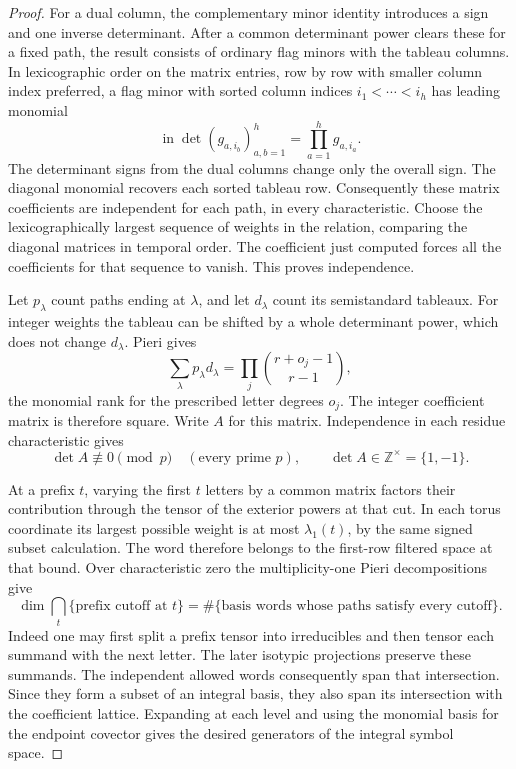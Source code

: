 \begin{proof}
For a dual column, the
complementary minor identity introduces a sign and one inverse
determinant. After a common determinant power clears these for a
fixed path, the result consists of ordinary flag minors with
the tableau columns. In lexicographic order on the matrix entries,
row by row with smaller column index preferred, a flag minor with sorted column indices \(i_1<\cdots<i_h\) has leading monomial
\[
 \operatorname{in}\det(g_{a,i_b})_{a,b=1}^h=\prod_{a=1}^h g_{a,i_a}.
\]
The determinant signs from the dual columns change only the overall sign. The diagonal
monomial recovers each sorted tableau row. Consequently these
matrix coefficients are independent for each path, in every
characteristic. Choose the lexicographically largest sequence of
weights in the relation, comparing the diagonal matrices in
temporal order. The coefficient just computed forces all the
coefficients for that sequence to vanish. This proves independence.

Let \(p_\lambda\) count paths ending at \(\lambda\), and let
\(d_\lambda\) count its semistandard tableaux. For integer weights
the tableau can be shifted by a whole determinant power, which
does not change \(d_\lambda\). Pieri gives
\[
 \sum_\lambda p_\lambda d_\lambda
       =\prod_j\binom{r+o_j-1}{r-1},
\]
the monomial rank for the prescribed letter degrees \(o_j\).
The integer coefficient matrix is therefore square. Write \(A\) for this matrix. Independence in each residue characteristic gives
\[
 \det A\not\equiv0\pmod p\quad(\text{every prime }p),\qquad \det A\in\mathbb Z^\times=\{1,-1\}.
\]


At a prefix \(t\), varying the first \(t\) letters by a common
matrix factors their contribution through the tensor of the exterior
powers at that cut. In each torus coordinate its largest possible
weight is at most \(\lambda_1(t)\), by the same signed subset
calculation. The word therefore belongs to the first-row filtered
space at that bound. Over characteristic zero the multiplicity-one Pieri decompositions give
\[
 \dim\bigcap_t\{\text{prefix cutoff at }t\}=\#\{\text{basis words whose paths satisfy every cutoff}\}.
\]
Indeed one
may first split a prefix tensor into irreducibles and then tensor
each summand with the next letter. The later isotypic projections
preserve these summands. The independent allowed words consequently
span that intersection. Since they form a subset of an integral
basis, they also span its intersection with the coefficient lattice.
Expanding at each level and using the monomial basis for the
endpoint covector gives the desired generators of the integral
symbol space.

\end{proof}

